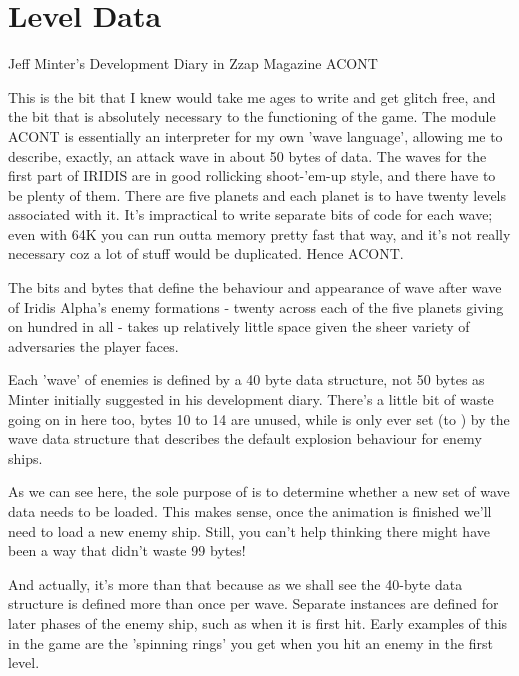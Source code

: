 \chapter{Level Data} 

\begin{q}{Jeff Minter's Development Diary in Zzap Magazine\cite{planner}}
ACONT 

This is the bit that I knew would take me ages to write and get glitch
free, and the bit that is absolutely necessary to the functioning of the game.
The module ACONT is essentially an interpreter for my own 'wave language',
allowing me to describe, exactly, an attack wave in about 50 bytes of data. The
waves for the first part of IRIDIS are in good rollicking shoot-'em-up style,
and there have to be plenty of them. There are five planets and each planet is
to have twenty levels associated with it. It's impractical to write separate
bits of code for each wave; even with 64K you can run outta memory pretty fast
that way, and it's not really necessary coz a lot of stuff would be duplicated.
Hence ACONT.

\end{q}

The bits and bytes that define the behaviour and appearance of
wave after wave of Iridis Alpha's enemy formations - twenty across each of the
five planets giving on hundred in all - takes up relatively little space given
the sheer variety of adversaries the player faces.

Each 'wave' of enemies is defined by a 40 byte data structure, not 50 bytes as
Minter initially suggested in his development diary. There's a little bit of 
waste going on in here too, bytes 10 to 14 are unused, while  is only
ever set (to ) by the wave data structure that describes the default explosion 
behaviour for enemy ships.

As we can see here, the sole purpose of  is to determine whether a
new set of wave data needs to be loaded. This makes sense, once the animation is finished
we'll need to load a new enemy ship. Still, you can't help thinking there might have been 
a way that didn't waste 99 bytes! 



And actually, it's more than that because as we shall see the  40-byte data
structure is defined more than once per wave. Separate instances are defined for later
phases of the enemy ship, such as when it is first hit. Early examples of this in the game
are the 'spinning rings' you get when you hit an enemy in the first level.

